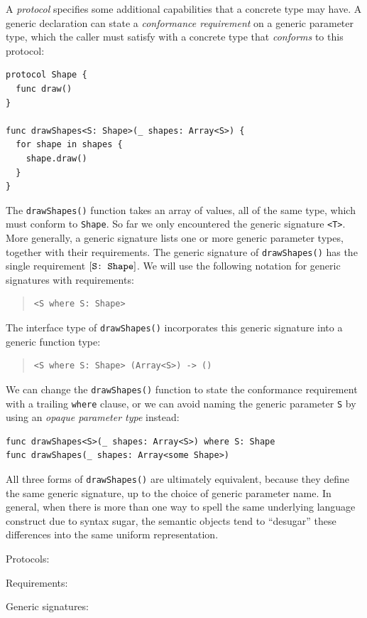 \documentclass[../generics]{subfiles}
\begin{document}
A \emph{protocol} specifies some additional capabilities that a concrete type may have. A generic declaration can state a \emph{conformance requirement} on a generic parameter type, which the caller must satisfy with a concrete type that \emph{conforms} to this protocol:
\begin{Verbatim}
protocol Shape {
  func draw()
}

func drawShapes<S: Shape>(_ shapes: Array<S>) {
  for shape in shapes {
    shape.draw()
  }
}
\end{Verbatim}

The \verb|drawShapes()| function takes an array of values, all of the same type, which must conform to \texttt{Shape}. So far we only encountered the generic signature \texttt{<T>}. More generally, a generic signature lists one or more generic parameter types, together with their requirements. The generic signature of \verb|drawShapes()| has the single requirement $[\texttt{S:~Shape}]$. We will use the following notation for generic signatures with requirements:
\begin{quote}
\begin{verbatim}
<S where S: Shape>
\end{verbatim}
\end{quote}
The interface type of \verb|drawShapes()| incorporates this generic signature into a generic function type:
\begin{quote}
\begin{verbatim}
<S where S: Shape> (Array<S>) -> ()
\end{verbatim}
\end{quote}
We can change the \verb|drawShapes()| function to state the conformance requirement with a trailing \texttt{where} clause, or we can avoid naming the generic parameter \texttt{S} by using an \emph{opaque parameter type} instead:
\begin{Verbatim}
func drawShapes<S>(_ shapes: Array<S>) where S: Shape
func drawShapes(_ shapes: Array<some Shape>)
\end{Verbatim}
All three forms of \verb|drawShapes()| are ultimately equivalent, because they define the same generic signature, up to the choice of generic parameter name. In general, when there is more than one way to spell the same underlying language construct due to syntax sugar, the semantic objects tend to ``desugar'' these differences into the same uniform representation.
\begin{MoreDetails}
\item Protocols: 
\item Requirements: 
\item Generic signatures: 
\end{MoreDetails}
\end{document}
